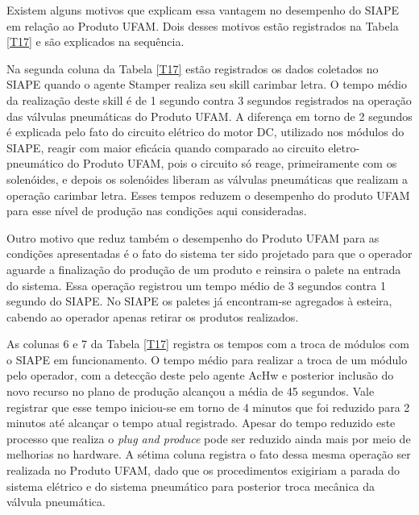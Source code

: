 Existem alguns motivos que explicam essa vantagem no desempenho do SIAPE em relação ao Produto UFAM. Dois desses motivos estão registrados na Tabela \ref{T17} e são explicados na sequência. \par 

Na segunda coluna da Tabela \ref{T17} estão registrados os dados coletados no SIAPE quando o agente Stamper realiza seu skill carimbar letra. O tempo médio da realização deste skill é de 1 segundo contra 3 segundos registrados na operação das válvulas pneumáticas do Produto UFAM. A diferença em torno de 2 segundos é explicada pelo fato do circuito elétrico do motor DC, utilizado nos módulos do SIAPE, reagir com maior eficácia  quando comparado ao circuito eletro-pneumático do Produto UFAM, pois o circuito só reage, primeiramente com os solenóides, e depois os solenóides liberam as válvulas pneumáticas que realizam a operação carimbar letra. Esses tempos reduzem o desempenho do produto UFAM para esse nível de produção nas condições aqui consideradas.\par

Outro motivo que reduz também o desempenho do Produto UFAM para as condições apresentadas é o fato do sistema ter sido projetado para que o operador aguarde a finalização do produção de um produto e reinsira o palete na entrada do sistema. Essa operação registrou um tempo médio de 3 segundos contra 1 segundo do SIAPE. No SIAPE os paletes já encontram-se agregados à esteira, cabendo ao operador apenas retirar os produtos realizados. 

As colunas 6 e 7 da Tabela \ref{T17} registra os tempos com a troca de módulos com o SIAPE em funcionamento. O tempo médio para realizar a troca de um módulo pelo operador, com a detecção deste pelo agente AcHw e posterior inclusão do novo recurso no plano de produção alcançou a média de 45 segundos. Vale registrar que esse tempo iniciou-se em torno de 4 minutos que foi reduzido para 2 minutos até alcançar o tempo atual registrado. Apesar do tempo reduzido este processo que realiza o \textit{plug and produce} pode ser reduzido ainda mais por meio de melhorias no hardware.  A sétima coluna registra o fato dessa mesma operação ser realizada no Produto UFAM, dado que os procedimentos exigiriam a parada do sistema elétrico e do sistema pneumático para posterior troca mecânica da válvula pneumática.

